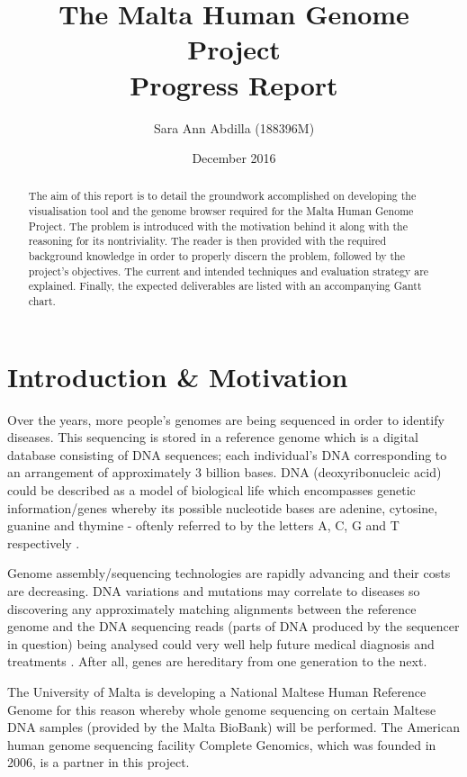 \documentclass{csfyp}
\title{The Malta Human Genome Project \\
  \large Progress Report}
\author{Sara Ann Abdilla (188396M)}
\date{December 2016}
\begin{document}
\tableofcontents

\newpage

\setcounter{page}{1}


\begin{abstract}
The aim of this report is to detail the groundwork accomplished on developing the visualisation tool and the genome browser required for the Malta Human Genome Project.  The problem is introduced with the motivation behind it along with the reasoning for its nontriviality.  The reader is then provided with the required background knowledge in order to properly discern the problem, followed by the project's objectives.  The current and intended techniques and evaluation strategy are explained.  Finally, the expected deliverables are listed with an accompanying Gantt chart.   
\end{abstract}


\section{Introduction \& Motivation}
\label{s:intro}

Over the years, more people's genomes are being sequenced in order to identify diseases.  This sequencing is stored in a reference genome which is a digital database consisting of DNA sequences; each individual's DNA corresponding to an arrangement of approximately 3 billion bases.  DNA (deoxyribonucleic acid) could be described as a model of biological life which encompasses genetic information/genes whereby its possible nucleotide bases are adenine, cytosine, guanine and thymine - oftenly referred to by the letters A, C, G and T respectively \cite{aiBk, introgenom}.  

Genome assembly/sequencing technologies are rapidly advancing and their costs are decreasing.  DNA variations and mutations may correlate to diseases so discovering any approximately matching alignments between the reference genome and the DNA sequencing reads (parts of DNA produced by the sequencer in question) being analysed could very well help future medical diagnosis and treatments \cite{think}.  After all, genes are hereditary from one generation to the next.

The University of Malta is developing a National Maltese Human Reference Genome for this reason whereby whole genome sequencing on certain Maltese DNA samples (provided by the Malta BioBank) will be performed.  The American human genome sequencing facility Complete Genomics, which was founded in 2006, is a partner in this project.   
\end{document}
